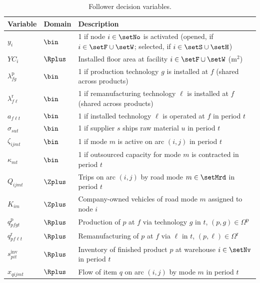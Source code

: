 \begin{table}[htbp]
\centering
\caption{Follower decision variables.}
\label{tab:variables}
\footnotesize
\renewcommand{\arraystretch}{1.15}
\begin{tabular}{@{}lll@{}}
\toprule
Variable & Domain & Description \\
\midrule
$y_i$ & $\bin$ & 1 if node $i\in\setNo$ is activated (opened, if $i\in\setF\cup\setW$; selected, if $i\in\setS\cup\setH$) \\
$YC_i$ & $\Rplus$ & Installed floor area at facility $i\in\setF\cup\setW$ (m$^2$) \\
$\lambda^{\mathrm{p}}_{fg}$ & $\bin$ & 1 if production technology $g$ is installed at $f$ (shared across products) \\
$\lambda^{\mathrm{r}}_{f\ell}$ & $\bin$ & 1 if remanufacturing technology $\ell$ is installed at $f$ (shared across products) \\
$a_{f\ell t}$ & $\bin$ & 1 if installed technology $\ell$ is operated at $f$ in period $t$ \\
$\sigma_{sut}$ & $\bin$ & 1 if supplier $s$ ships raw material $u$ in period $t$ \\
$\zeta_{ijmt}$ & $\bin$ & 1 if mode $m$ is active on arc $(i,j)$ in period $t$ \\
$\kappa_{mt}$ & $\bin$ & 1 if outsourced capacity for mode $m$ is contracted in period $t$ \\
$Q_{ijmt}$ & $\Zplus$ & Trips on arc $(i,j)$ by road mode $m\in\setMrd$ in period $t$ \\
$K_{im}$ & $\Zplus$ & Company-owned vehicles of road mode $m$ assigned to node $i$ \\
$q^{\mathrm{p}}_{pfgt}$ & $\Rplus$ & Production of $p$ at $f$ via technology $g$ in $t$, $(p,g)\in\Omega^{\mathrm{p}}$ \\
$q^{\mathrm{r}}_{pf\ell t}$ & $\Rplus$ & Remanufacturing of $p$ at $f$ via $\ell$ in $t$, $(p,\ell)\in\Omega^{\mathrm{r}}$ \\
$s^{\mathrm{inv}}_{pit}$ & $\Rplus$ & Inventory of finished product $p$ at warehouse $i\in\setNv$ in period $t$ \\
$x_{qijmt}$ & $\Rplus$ & Flow of item $q$ on arc $(i,j)$ by mode $m$ in period $t$ \\
\bottomrule
\end{tabular}
\end{table}
